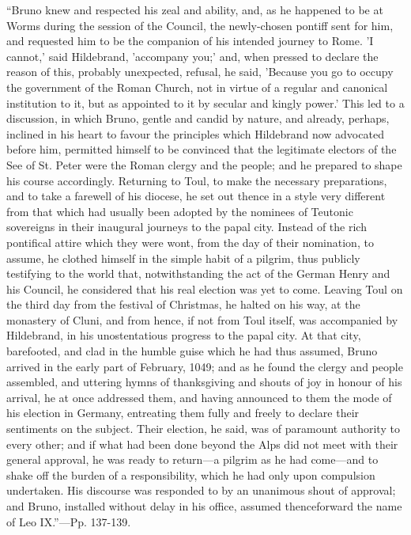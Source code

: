``Bruno
knew and respected his zeal and ability, and, as he happened to be at
Worms during the session of the Council, the newly-chosen pontiff sent
for him, and requested him to be the companion of his intended journey
to Rome. 'I cannot,' said Hildebrand, 'accompany you;' and, when
pressed to declare the reason of this, probably unexpected, refusal,
he said, 'Because you go to occupy the government of the Roman Church,
not in virtue of a regular and canonical institution to it, but as
appointed to it by secular and kingly power.' This led to a
discussion, in which Bruno, gentle and candid by nature, and already,
perhaps, inclined in his heart to favour the principles which
Hildebrand now advocated before him, permitted himself to be convinced
that the legitimate electors of the See of St. Peter were the Roman
clergy and the people; and he prepared to shape his course
accordingly. Returning to Toul, to make the necessary preparations,
and to take a farewell of his diocese, he set out thence in a style
very different from that which had usually been adopted by the
nominees of Teutonic sovereigns in their inaugural journeys to the
papal city. Instead of the rich pontifical attire which they were
wont, from the day of their nomination, to assume, he clothed himself
in the simple habit of a pilgrim, thus publicly testifying to the
world that, notwithstanding the act of the German Henry and his
Council, he considered that his real election was yet to come. Leaving
Toul on the third day from the festival of Christmas, he halted on his
way, at the monastery of Cluni, and from hence, if not from Toul
itself, was accompanied by Hildebrand, in his unostentatious progress
to the papal city. At that city, barefooted, and clad in the humble
guise which he had thus assumed, Bruno arrived in the early part of
February, 1049; and as he found the clergy and people assembled, and uttering hymns of thanksgiving and
shouts of joy in honour of his arrival, he at once addressed them, and
having announced to them the mode of his election in Germany,
entreating them fully and freely to declare their sentiments on the
subject. Their election, he said, was of paramount authority to every
other; and if what had been done beyond the Alps did not meet with
their general approval, he was ready to return—a pilgrim as he had
come—and to shake off the burden of a responsibility, which he had
only upon compulsion undertaken. His discourse was responded to by an
unanimous shout of approval; and Bruno, installed without delay in his
office, assumed thenceforward the name of Leo IX.''—Pp. 137-139.

